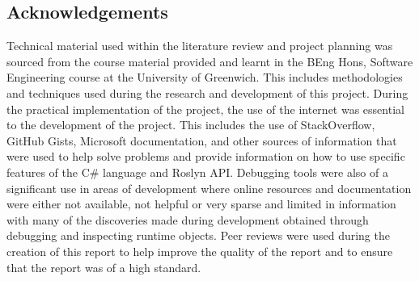 \subsection*{Acknowledgements}


Technical material used within the literature review and project planning was sourced from the course material provided and learnt in the BEng Hons, Software Engineering course at the University of Greenwich. This includes methodologies and techniques used during the research and development of this project.
During the practical implementation of the project, the use of the internet was essential to the development of the project. This includes the use of StackOverflow, GitHub Gists, Microsoft documentation, and other sources of information that were used to help solve problems and provide information on how to use specific features of the C\# language and Roslyn API. Debugging tools were also of a significant use in areas of development where online resources and documentation were either not available, not helpful or very sparse and limited in information with many of the discoveries made during development obtained through debugging and inspecting runtime objects.
Peer reviews were used during the creation of this report to help improve the quality of the report and to ensure that the report was of a high standard.
